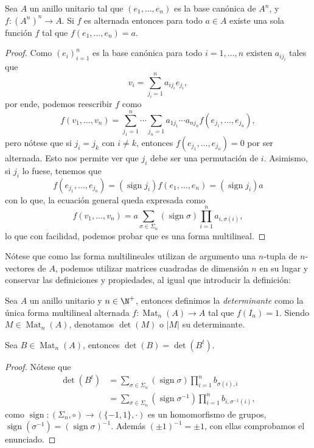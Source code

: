\documentclass[11pt,oneside]{book}
\DeclareMathOperator{\Mat}{Mat}
\DeclareMathOperator{\sign}{sign}
\begin{document}
\begin{thm}
Sea $A$ un anillo unitario tal que $(e_1,\dots,e_n)$ es la base canónica de $A^n$, y $f:(A^n)^n\rightarrow A$. Si $f$ es alternada entonces para todo $a\in A$ existe una sola función $f$ tal que $f(e_1,\dots,e_n)=a$.
\end{thm}
\begin{proof}
Como $(e_i)_{i=1}^n$ es la base canónica para todo $i=1,\dots,n$ existen $a_{ij_i}$ tales que
$$v_i=\sum_{j_i=1}^n a_{ij_i}e_{j_i},$$
por ende, podemos reescribir $f$ como
$$f(v_1,\dots,v_n)=\sum_{j_1=1}^n\cdots\sum_{j_n=1}a_{1j_1}\cdots a_{nj_n}f(e_{j_1},\dots,e_{j_n}),$$
pero nótese que si $j_i=j_k$ con $i\neq k$, entonces $f(e_{j_1},\dots,e_{j_n})=0$ por ser alternada. Esto nos permite ver que $j_i$ debe ser una permutación de $i$. Asimismo, si $j_i$ lo fuese, tenemos que
$$f(e_{j_1},\dots,e_{j_n})=(\sign j_i)f(e_1,\dots,e_n)=(\sign j_i)a$$
con lo que, la ecuación general queda expresada como
\begin{equation}
f(v_1,\dots,v_n)=a\sum_{\sigma\in\Sigma_n}(\sign\sigma)\prod_{i=1}^na_{i,\sigma(i)},
\end{equation}
lo que con facilidad, podemos probar que es una forma multilineal.
\end{proof}
Nótese que como las forma multilineales utilizan de argumento una $n$-tupla de $n$-vectores de $A$, podemos utilizar matrices cuadradas de dimensión $n$ en su lugar y conservar las definiciones y propiedades, al igual que introducir la definición:
\begin{mydef}[Determinante]
Sea $A$ un anillo unitario y $n\in\N^+$, entonces definimos la \textit{determinante} como la única forma multilineal alternada $f:\Mat_n(A)\rightarrow A$ tal que $f(I_n)=1$. Siendo $M\in\Mat_n(A)$, denotamos $\det(M)$ o $|M|$ su determinante. 
\end{mydef}
\begin{thm}
Sea $B\in\Mat_n(A)$, entonces $\det(B)=\det(B^t)$.
\end{thm}
\begin{proof}
Nótese que
\begin{align*}
\det(B^t)&=\sum_{\sigma\in\Sigma_n}(\sign\sigma)\prod_{i=1}^nb_{\sigma(i),i}\\
&=\sum_{\sigma\in\Sigma_n}(\sign\sigma^{-1})\prod_{i=1}^nb_{i,\sigma^{-1}(i)},
\end{align*}
como $\sign:(\Sigma_n,\circ)\rightarrow(\{-1,1\},\cdot)$ es un homomorfismo de grupos, $\sign(\sigma^{-1})=(\sign\sigma)^{-1}$. Además $(\pm 1)^{-1}=\pm 1$, con ellas comprobamos el enunciado.
\end{proof}
\end{document}
